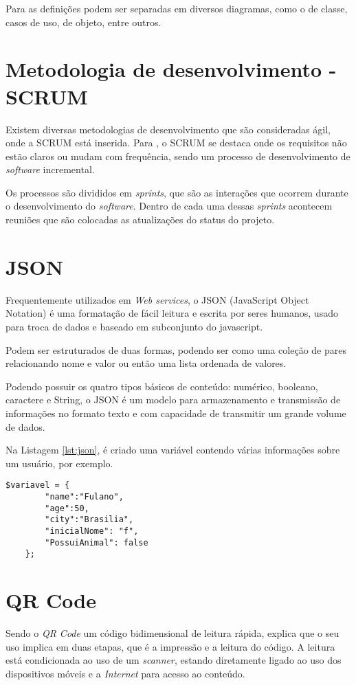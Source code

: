 Para as definições podem ser separadas em diversos diagramas, como o de classe, casos de uso, de objeto, entre outros. 

\section{Metodologia de desenvolvimento - SCRUM}
Existem diversas metodologias de desenvolvimento que são consideradas ágil, onde a SCRUM está inserida. Para \citet{dos2013}, o SCRUM se destaca onde os requisitos não estão claros ou mudam com frequência, sendo um processo de desenvolvimento de \textit{software} incremental.

Os processos são divididos em \textit{sprints}, que são as interações que ocorrem durante o desenvolvimento do \textit{software}. Dentro de cada uma dessas \textit{sprints} acontecem reuniões que são colocadas as atualizações do status do projeto.  

\section{JSON}
Frequentemente utilizados em \textit{Web services}, o JSON (JavaScript Object Notation) é uma formatação de fácil leitura e escrita por seres humanos, usado para troca de dados e baseado em subconjunto do javascript.

Podem ser estruturados de duas formas, podendo ser como uma coleção de pares relacionando nome e valor ou então uma lista ordenada de valores. 

Podendo possuir os quatro tipos básicos de conteúdo: numérico, booleano, caractere e String, o JSON é um modelo para armazenamento e transmissão de informações no formato texto e com capacidade de transmitir um grande volume de dados.

Na Listagem \ref{lst:json}, é criado uma variável contendo várias informações sobre um usuário, por exemplo. 

\begin{lstlisting}[caption={Exemplo de JSON},label={lst:json}]
	$variavel = { 
		"name":"Fulano", 
		"age":50, 
		"city":"Brasilia",
		"inicialNome": "f",
		"PossuiAnimal": false
	};
\end{lstlisting}

\section{QR Code}
Sendo o \textit{QR Code} um código bidimensional de leitura rápida, \citet{sousa2014} explica que o seu uso implica em duas etapas, que é a impressão e a leitura do código. A leitura está condicionada ao uso de um \textit{scanner}, estando diretamente ligado ao uso dos dispositivos móveis e a \textit{Internet} para acesso ao conteúdo.

